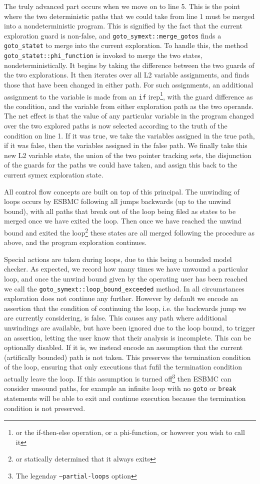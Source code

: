 \documentclass{article}
\begin{document}
The truly advanced part occurs when we move on to line 5. This is the point
where the two deterministic paths that we could take from line 1 must be
merged into a nondeterministic program. This is signified by the fact that the
current exploration guard is non-false, and \texttt{goto\_symext::merge\_gotos}
finds a \texttt{goto\_statet} to merge into the current exploration. To handle
this, the method \texttt{goto\_statet::phi\_function} is invoked to merge the
two states, nondeterministically. It begins by taking the difference between
the two guards of the two explorations. It then iterates over all L2 variable
assignments, and finds those that have been changed in either path. For such
assignments, an additional assignment to the variable is made from an
\texttt{if} irep\footnote{or the if-then-else operation, or a phi-function, or
however you wish to call it}, with the guard difference as the condition, and
the variable from either exploration path as the two operands. The net effect
is that the value of any particular variable in the program changed over the
two explored paths is now selected according to the truth of the condition
on line 1. If it was true, we take the variables assigned in the true path,
if it was false, then the variables assigned in the false path. We finally
take this new L2 variable state, the union of the two pointer tracking sets,
the disjunction of the guards for the paths we could have taken, and assign
this back to the current symex exploration state.

All control flow concepts are built on top of this principal. The unwinding of
loops occurs by ESBMC following all jumps backwards (up to the unwind bound),
with all paths that break out of the loop being filed as states to be merged
once we have exited the loop. Then once we have reached the unwind bound and
exited the loop\footnote{or statically determined that it always exits} these
states are all merged following the procedure as above, and the program
exploration continues.

Special actions are taken during loops, due to this being a bounded model
checker. As expected, we record how many times we have unwound a particular
loop, and once the unwind bound given by the operating user has been reached
we call the \texttt{goto\_symext::loop\_bound\_exceeded} method. In all
circumstances exploration does not continue any further. However by default
we encode an assertion that the condition of continuing the loop, i.e. the
backwards jump we are currently considering, is false. This causes any path
where additional unwindings are available, but have been ignored due to the loop
bound, to trigger an assertion, letting the user know that their analysis is
incomplete. This can be optionally disabled. If it is, we instead encode an
assumption that the current (artifically bounded) path is not taken. This
preserves the termination condition of the loop, ensuring that only executions
that fufil the termination condition actually leave the loop. If this assumption
is turned off\footnote{The legenday \texttt{--partial-loops} option} then
ESBMC can consider unsound paths, for example an infinite loop with no
\texttt{goto} or \texttt{break} statements will be able to exit and continue
execution because the termination condition is not preserved.
\end{document}
